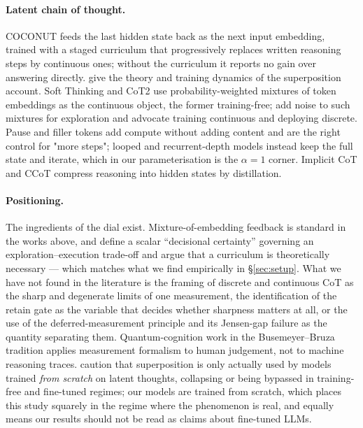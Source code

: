\documentclass[11pt]{article}
\theoremstyle{definition}
\begin{document}
\paragraph{Latent chain of thought.} COCONUT \citep{hao2024coconut} feeds the last
hidden state back as the next input embedding, trained with a staged curriculum
that progressively replaces written reasoning steps by continuous ones; without the
curriculum it reports no gain over answering directly.
\citet{zhu2025superposition,zhu2025emergence} give the theory and training dynamics
of the superposition account. Soft Thinking \citep{zhang2025softthinking} and CoT2
\citep{gozeten2025cot2} use probability-weighted mixtures of token embeddings as the
continuous object, the former training-free; \citet{butt2025softtokens} add noise to
such mixtures for exploration and advocate training continuous and deploying
discrete. Pause and filler tokens \citep{goyal2023pause,pfau2024dots} add compute
without adding content and are the right control for "more steps"; looped and
recurrent-depth models \citep{dehghani2018universal,geiping2025recurrent} instead
keep the full state and iterate, which in our parameterisation is the $\alpha = 1$
corner. Implicit CoT \citep{deng2023implicit} and CCoT \citep{cheng2024compressed}
compress reasoning into hidden states by distillation.

\paragraph{Positioning.} The ingredients of the dial exist. Mixture-of-embedding
feedback is standard in the works above, and \citet{zou2026limits} define a scalar
``decisional certainty'' governing an exploration--execution trade-off and argue
that a curriculum is theoretically necessary --- which matches what we find
empirically in \S\ref{sec:setup}. What we have not found in the literature is the
framing of discrete and continuous CoT as the sharp and degenerate limits of one
measurement, the identification of the retain gate as the variable that decides
whether sharpness matters at all, or the use of the deferred-measurement principle
and its Jensen-gap failure as the quantity separating them. Quantum-cognition work
in the Busemeyer--Bruza tradition \citep{busemeyer2012quantum} applies measurement
formalism to human judgement, not to machine reasoning traces.
\citet{rizvimartel2026illusion} caution that superposition is only actually used by
models trained \emph{from scratch} on latent thoughts, collapsing or being bypassed
in training-free and fine-tuned regimes; our models are trained from scratch, which
places this study squarely in the regime where the phenomenon is real, and equally
means our results should not be read as claims about fine-tuned LLMs.
\end{document}
